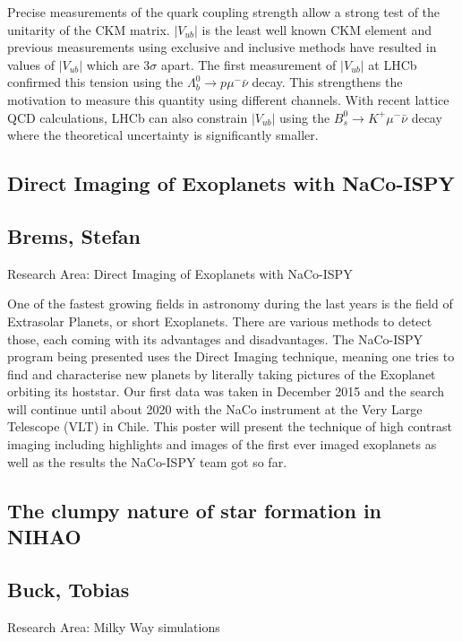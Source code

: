 \noindent Precise measurements of the quark coupling strength allow a strong test of the unitarity of the CKM matrix. $|V_{ub}|$ is the least well known CKM element and previous measurements using exclusive and inclusive methods have resulted in values of $|V_{ub}|$ which are 3$\sigma$ apart. The first measurement of $|V_{ub}|$ at LHCb confirmed this tension using the $\Lambda^0_b \rightarrow p \mu^- \bar{\nu}$ decay. This strengthens the motivation to measure this quantity using different channels. With recent lattice QCD calculations, LHCb can also constrain $|V_{ub}|$ using the $B^0_s\rightarrow K^+ \mu^- \bar{\nu}$ decay where the theoretical uncertainty is significantly smaller.

\newpage
\subsection*{\centering \large Direct Imaging of Exoplanets with NaCo-ISPY}
\subsection*{\centering \normalsize Brems, Stefan}
Research Area: Direct Imaging of Exoplanets with NaCo-ISPY\newline

\noindent One of the fastest growing fields in astronomy during the last years is the field of Extrasolar Planets, or short Exoplanets. There are various methods to detect those, each coming with its advantages and disadvantages. The NaCo-ISPY program being presented uses the Direct Imaging technique, meaning one tries to find and characterise new planets by literally taking pictures of the Exoplanet orbiting its hoststar. Our first data was taken in December 2015 and the search will continue until about 2020 with the NaCo instrument at the Very Large Telescope (VLT) in Chile. This poster will present the technique of high contrast imaging including highlights and images of the first ever imaged exoplanets as well as the results the NaCo-ISPY team got so far.


\subsection*{\centering \large The clumpy nature of star formation in NIHAO}
\subsection*{\centering \normalsize Buck, Tobias}
Research Area: Milky Way simulations\newline

